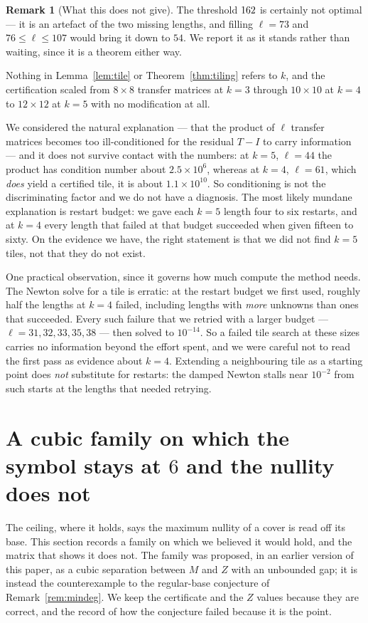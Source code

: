 \documentclass[11pt]{article}
\theoremstyle{definition}
\newtheorem{remark}[theorem]{Remark}
\begin{document}
\begin{remark}[What this does not give]
\noindent
The threshold $162$ is certainly not optimal --- it is an artefact of the
two missing lengths, and filling $\ell=73$ and $76\le\ell\le107$ would bring it
down to $54$. We report it as it stands rather than waiting, since it is a
theorem either way.

Nothing in Lemma~\ref{lem:tile} or Theorem~\ref{thm:tiling}
refers to $k$, and the certification scaled from $8\times8$ transfer matrices at
$k=3$ through $10\times10$ at $k=4$ to $12\times12$ at $k=5$ with no
modification at all.

We considered the natural explanation --- that the product of $\ell$ transfer
matrices becomes too ill-conditioned for the residual $T-I$ to carry
information --- and it does not survive contact with the numbers: at $k=5$,
$\ell=44$ the product has condition number about $2.5\times10^{6}$, whereas at
$k=4$, $\ell=61$, which \emph{does} yield a certified tile, it is about
$1.1\times10^{10}$. So conditioning is not the discriminating factor and we do not
have a diagnosis. The most likely mundane explanation is restart budget: we gave
each $k=5$ length four to six restarts, and at $k=4$ every length that failed at
that budget succeeded when given fifteen to sixty. On the evidence we have, the
right statement is that we did not find $k=5$ tiles, not that they do not exist.

One practical observation, since it governs how much compute the method needs.
The Newton solve for a tile is erratic: at the restart budget we first used,
roughly half the lengths at $k=4$ failed, including lengths with \emph{more}
unknowns than ones that succeeded. Every such failure that we retried with a
larger budget --- $\ell=31,32,33,35,38$ --- then solved to $10^{-14}$. So a failed
tile search at these sizes carries no information beyond the effort spent, and we
were careful not to read the first pass as evidence about $k=4$. Extending a
neighbouring tile as a starting point does \emph{not} substitute for restarts:
the damped Newton stalls near $10^{-2}$ from such starts at the lengths that
needed retrying.
\end{remark}

\section{A cubic family on which the symbol stays at \texorpdfstring{$6$}{6} and the nullity does not}
\label{sec:gapfamily}

The ceiling, where it holds, says the maximum nullity of a cover is read off its
base. This section records a family on which we believed it would hold, and the
matrix that shows it does not. The family was proposed, in an earlier version of
this paper, as a cubic separation between $M$ and $Z$ with an unbounded gap; it
is instead the counterexample to the regular-base conjecture of
Remark~\ref{rem:mindeg}. We keep the certificate and the $Z$ values because they
are correct, and the record of how the conjecture failed because it is the
point.
\end{document}
